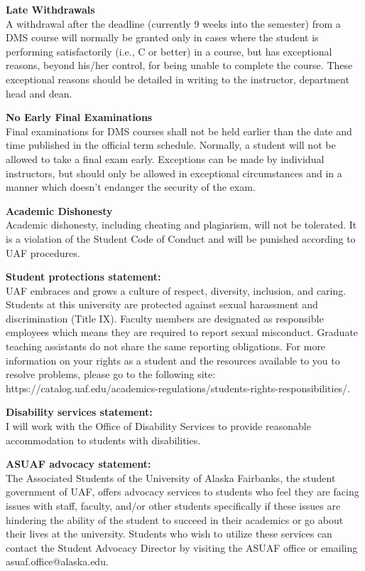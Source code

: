 \documentclass[12pt]{article}
\renewcommand{\emph}[1]{\textsf{\textbf{#1}}}
\newcommand{\localhead}[1]{\par\smallskip\textbf{#1}\nobreak\\}%
\def\subheading#1{\localhead{\emph{#1}}}
\begin{document}
\subheading{Late Withdrawals} 
A withdrawal after the deadline
  (currently 9 weeks into the semester) from a DMS course will
  normally be granted only in cases where the student is performing
  satisfactorily (i.e., C or better) in a course, but has exceptional
  reasons, beyond his/her control, for being unable to complete the
  course. These exceptional reasons should be detailed in writing to
  the instructor, department head and dean.

\subheading{No Early Final Examinations}
Final examinations for DMS
  courses shall not be held earlier than the date and time published
  in the official term schedule. Normally, a student will not be
  allowed to take a final exam early. Exceptions can be made by
  individual instructors, but should only be allowed in exceptional
  circumstances and in a manner which doesn't endanger the security of
  the exam.

\subheading{Academic Dishonesty}
Academic dishonesty, including cheating and plagiarism, will not
be tolerated.  It is a violation of the Student Code of Conduct
and will be punished according to UAF procedures.

 
\subheading{ Student protections statement:} UAF embraces and grows a culture of respect, diversity, inclusion, and caring. Students at this university are protected against sexual harassment and discrimination (Title IX). Faculty members are designated as responsible employees which means they are required to report sexual misconduct. Graduate teaching assistants do not share the same reporting obligations. For more information on your rights as a student and the resources available to you to resolve problems, please go to the following site: https://catalog.uaf.edu/academics-regulations/students-rights-responsibilities/.

\subheading{Disability services statement:} I will work with the Office of Disability Services to provide reasonable accommodation to students with disabilities.

\subheading{ASUAF advocacy statement:} The Associated Students of the University of Alaska Fairbanks, the student government of UAF, offers advocacy services to students who feel they are facing issues with staff, faculty, and/or other students specifically if these issues are hindering the ability of the student to succeed in their academics or go about their lives at the university. Students who wish to utilize these services can contact the Student Advocacy Director by visiting the ASUAF office or emailing asuaf.office@alaska.edu. 
\end{document}
